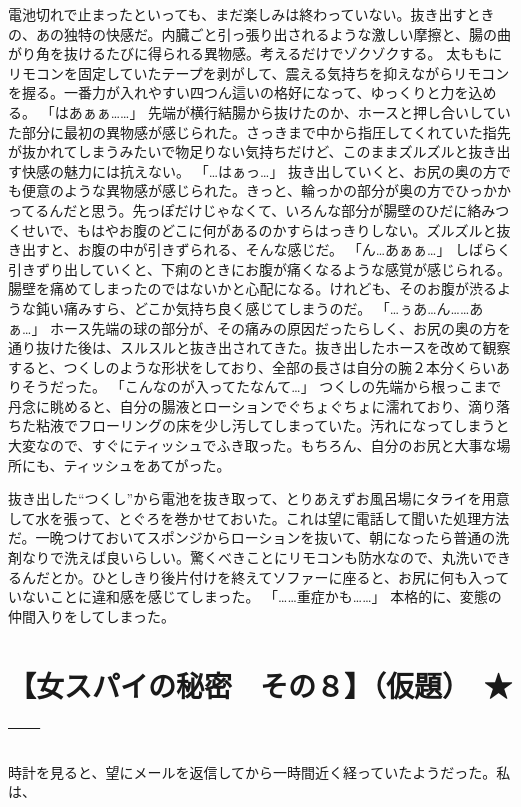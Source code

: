 電池切れで止まったといっても、まだ楽しみは終わっていない。抜き出すときの、あの独特の快感だ。内臓ごと引っ張り出されるような激しい摩擦と、腸の曲がり角を抜けるたびに得られる異物感。考えるだけでゾクゾクする。
太ももにリモコンを固定していたテープを剥がして、震える気持ちを抑えながらリモコンを握る。一番力が入れやすい四つん這いの格好になって、ゆっくりと力を込める。
「はあぁぁ……」
先端が横行結腸から抜けたのか、ホースと押し合いしていた部分に最初の異物感が感じられた。さっきまで中から指圧してくれていた指先が抜かれてしまうみたいで物足りない気持ちだけど、このままズルズルと抜き出す快感の魅力には抗えない。
「…はぁっ…」
抜き出していくと、お尻の奥の方でも便意のような異物感が感じられた。きっと、輪っかの部分が奥の方でひっかかってるんだと思う。先っぽだけじゃなくて、いろんな部分が腸壁のひだに絡みつくせいで、もはやお腹のどこに何があるのかすらはっきりしない。ズルズルと抜き出すと、お腹の中が引きずられる、そんな感じだ。
「ん…あぁぁ…」
しばらく引きずり出していくと、下痢のときにお腹が痛くなるような感覚が感じられる。腸壁を痛めてしまったのではないかと心配になる。けれども、そのお腹が渋るような鈍い痛みすら、どこか気持ち良く感じてしまうのだ。
「…ぅあ…ん……あぁ…」
ホース先端の球の部分が、その痛みの原因だったらしく、お尻の奥の方を通り抜けた後は、スルスルと抜き出されてきた。抜き出したホースを改めて観察すると、つくしのような形状をしており、全部の長さは自分の腕２本分くらいありそうだった。
「こんなのが入ってたなんて…」
つくしの先端から根っこまで丹念に眺めると、自分の腸液とローションでぐちょぐちょに濡れており、滴り落ちた粘液でフローリングの床を少し汚してしまっていた。汚れになってしまうと大変なので、すぐにティッシュでふき取った。もちろん、自分のお尻と大事な場所にも、ティッシュをあてがった。

抜き出した“つくし”から電池を抜き取って、とりあえずお風呂場にタライを用意して水を張って、とぐろを巻かせておいた。これは望に電話して聞いた処理方法だ。一晩つけておいてスポンジからローションを抜いて、朝になったら普通の洗剤なりで洗えば良いらしい。驚くべきことにリモコンも防水なので、丸洗いできるんだとか。ひとしきり後片付けを終えてソファーに座ると、お尻に何も入っていないことに違和感を感じてしまった。
「……重症かも……」
本格的に、変態の仲間入りをしてしまった。



\section{【女スパイの秘密　その８】（仮題）　★---}



時計を見ると、望にメールを返信してから一時間近く経っていたようだった。私は、


